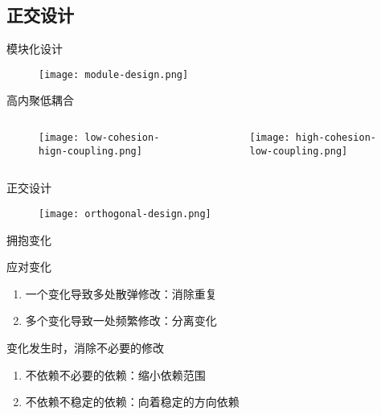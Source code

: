\subsection{正交设计}

\begin{frame}{模块化设计}
  \begin{figure}
    \centering
    \texttt{[image: module-design.png]}
  \end{figure}
\end{frame}

\begin{frame}{高内聚低耦合}
\begin{columns} 
  \begin{column}{0.5\textwidth}
  \begin{figure}
    \centering
    \texttt{[image: low-cohesion-hign-coupling.png]}
  \end{figure}
  \end{column}
  
  \begin{column}{0.5\textwidth}
  \begin{figure}
    \centering
    \texttt{[image: high-cohesion-low-coupling.png]}
  \end{figure}
  \end{column}
  \end{columns}  
\end{frame}

\begin{frame}{正交设计}
  \begin{figure}
    \centering
    \texttt{[image: orthogonal-design.png]}
  \end{figure}
\end{frame}

\begin{frame}{拥抱变化}
  \begin{block}{应对变化} 
    \begin{enumerate}
    \item \alert{一个变化导致多处散弹修改}：消除重复
    \item \alert{多个变化导致一处频繁修改}：分离变化
    \end{enumerate}
  \end{block}

  \begin{block}{变化发生时，消除不必要的修改} 
    \begin{enumerate}
    \item \alert{不依赖不必要的依赖}：缩小依赖范围
    \item \alert{不依赖不稳定的依赖}：向着稳定的方向依赖
    \end{enumerate}
  \end{block}
\end{frame}
